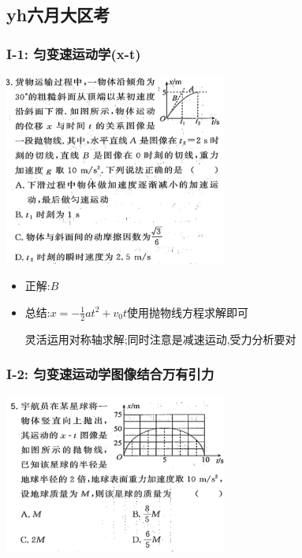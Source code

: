 \documentclass{article}
\begin{document}
\vspace{2em}

\subsection{yh六月大区考}
\subsubsection{I-1: 匀变速运动学(x-t)}
\includegraphics[width=0.55\textwidth,keepaspectratio]{./pictures/3.12-1.png}

\begin{itemize}
    \item 正解:\quad $B$
    \item 总结:\quad $x = -\frac{1}{2} a t^{2} + v_{0}t$使用抛物线方程求解即可

          \hspace{3.2em}灵活运用对称轴求解;同时注意是减速运动,受力分析要对
\end{itemize}

\vspace{2em}

\subsubsection{I-2: 匀变速运动学图像结合万有引力}
\includegraphics[width=0.55\textwidth,keepaspectratio]{./pictures/3.12-2.png}
\end{document}
